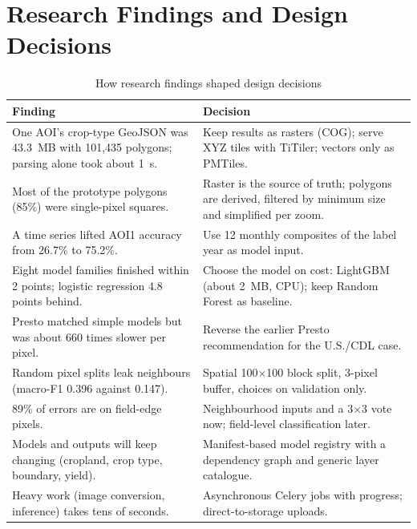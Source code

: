 \section{Research Findings and Design Decisions}
\begin{table}[htbp]
\centering\small
\caption{How research findings shaped design decisions}
\label{tab:findings}
\begin{tabularx}{\textwidth}{L{6.4cm} Y}
\toprule
\textbf{Finding} & \textbf{Decision}\\
\midrule
One AOI's crop-type GeoJSON was 43.3~MB with 101,435 polygons; parsing alone took about 1~s. & Keep results as rasters (COG); serve XYZ tiles with TiTiler; vectors only as PMTiles.\\
Most of the prototype polygons (85\%) were single-pixel squares. & Raster is the source of truth; polygons are derived, filtered by minimum size and simplified per zoom.\\
A time series lifted AOI1 accuracy from 26.7\% to 75.2\%. & Use 12 monthly composites of the label year as model input.\\
Eight model families finished within 2 points; logistic regression 4.8 points behind. & Choose the model on cost: LightGBM (about 2~MB, CPU); keep Random Forest as baseline.\\
Presto matched simple models but was about 660 times slower per pixel. & Reverse the earlier Presto recommendation for the U.S./CDL case.\\
Random pixel splits leak neighbours (macro-F1 0.396 against 0.147). & Spatial 100$\times$100 block split, 3-pixel buffer, choices on validation only.\\
89\% of errors are on field-edge pixels. & Neighbourhood inputs and a 3$\times$3 vote now; field-level classification later.\\
Models and outputs will keep changing (cropland, crop type, boundary, yield). & Manifest-based model registry with a dependency graph and generic layer catalogue.\\
Heavy work (image conversion, inference) takes tens of seconds. & Asynchronous Celery jobs with progress; direct-to-storage uploads.\\
\bottomrule
\end{tabularx}
\end{table}
